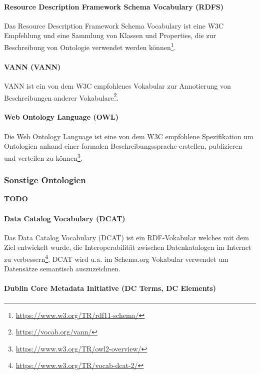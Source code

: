 \documentclass{article}
\begin{document}
\paragraph{Resource Description Framework Schema Vocabulary (RDFS)}

Das Resource Description Framework Schema Vocabulary ist eine W3C Empfehlung und eine Sammlung von Klassen und Properties, die zur Beschreibung von Ontologie verwendet werden können\footnote{\url{https://www.w3.org/TR/rdf11-schema/}}.

\paragraph{VANN (VANN)}

VANN ist ein von dem W3C empfohlenes Vokabular zur Annotierung von Beschreibungen anderer Vokabulare\footnote{\url{https://vocab.org/vann/}}.

\paragraph{Web Ontology Language (OWL)}

Die Web Ontology Language ist eine von dem W3C empfohlene Spezifikation um Ontologien anhand einer formalen Beschreibungssprache erstellen, publizieren und verteilen zu können\footnote{\url{https://www.w3.org/TR/owl2-overview/}}.

\subsubsection{Sonstige Ontologien}

\textbf{TODO}

\paragraph{Data Catalog Vocabulary (DCAT)}

Das Data Catalog Vocabulary (DCAT) ist ein RDF-Vokabular welches mit dem Ziel entwickelt wurde, die Interoperabilität zwischen Datenkatalogen im Internet zu verbessern\footnote{\url{https://www.w3.org/TR/vocab-dcat-2/}}.
DCAT wird u.a. im Schema.org Vokabular verwendet um Datensätze semantisch auszuzeichnen.

\paragraph{Dublin Core Metadata Initiative (DC Terms, DC Elements)}
\end{document}
